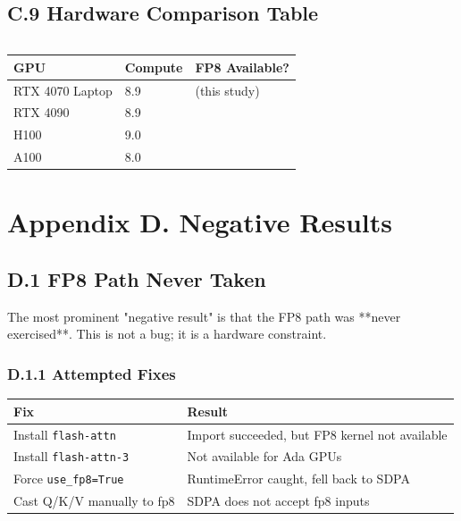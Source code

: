 \subsection{C.9 Hardware Comparison Table}

\begin{lstlisting}
\end{lstlisting}
\begin{table}[H]
\centering
\small
\begin{tabular}{lll}
\toprule
\textbf{GPU} & \textbf{Compute} & \textbf{FP8 Available?} \\
\midrule
RTX 4070 Laptop & 8.9 & (this study) \\
RTX 4090 & 8.9 &  \\
H100 & 9.0 &  \\
A100 & 8.0 &  \\
\bottomrule
\end{tabular}
\end{table}




\section{Appendix D. Negative Results}

\subsection{D.1 FP8 Path Never Taken}

The most prominent "negative result" is that the FP8 path was **never 
exercised**. This is not a bug; it is a hardware constraint.

\subsubsection{D.1.1 Attempted Fixes}

\begin{table}[H]
\centering
\small
\begin{tabular}{ll}
\toprule
\textbf{Fix} & \textbf{Result} \\
\midrule
Install \texttt{flash-attn} & Import succeeded, but FP8 kernel not available \\
Install \texttt{flash-attn-3} & Not available for Ada GPUs \\
Force \texttt{use\_fp8=True} & RuntimeError caught, fell back to SDPA \\
Cast Q/K/V manually to fp8 & SDPA does not accept fp8 inputs \\
\bottomrule
\end{tabular}
\end{table}

